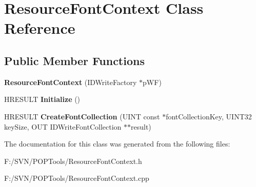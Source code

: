 \hypertarget{class_resource_font_context}{\section{Resource\-Font\-Context Class Reference}
\label{class_resource_font_context}
}
\subsection*{Public Member Functions}
\begin{DoxyCompactItemize}
\item 
\hypertarget{class_resource_font_context_abf2e56012e472e0c2d8f81fcd9cced23}{{\bfseries Resource\-Font\-Context} (I\-D\-Write\-Factory $\ast$p\-W\-F)}\label{class_resource_font_context_abf2e56012e472e0c2d8f81fcd9cced23}

\item 
\hypertarget{class_resource_font_context_aa356746f33312645aaf8457701970e8a}{H\-R\-E\-S\-U\-L\-T {\bfseries Initialize} ()}\label{class_resource_font_context_aa356746f33312645aaf8457701970e8a}

\item 
\hypertarget{class_resource_font_context_a38889b18f363c929175706c74315e248}{H\-R\-E\-S\-U\-L\-T {\bfseries Create\-Font\-Collection} (U\-I\-N\-T const $\ast$font\-Collection\-Key, U\-I\-N\-T32 key\-Size, O\-U\-T I\-D\-Write\-Font\-Collection $\ast$$\ast$result)}\label{class_resource_font_context_a38889b18f363c929175706c74315e248}

\end{DoxyCompactItemize}


The documentation for this class was generated from the following files\-:\begin{DoxyCompactItemize}
\item 
F\-:/\-S\-V\-N/\-P\-O\-P\-Tools/Resource\-Font\-Context.\-h\item 
F\-:/\-S\-V\-N/\-P\-O\-P\-Tools/Resource\-Font\-Context.\-cpp\end{DoxyCompactItemize}
